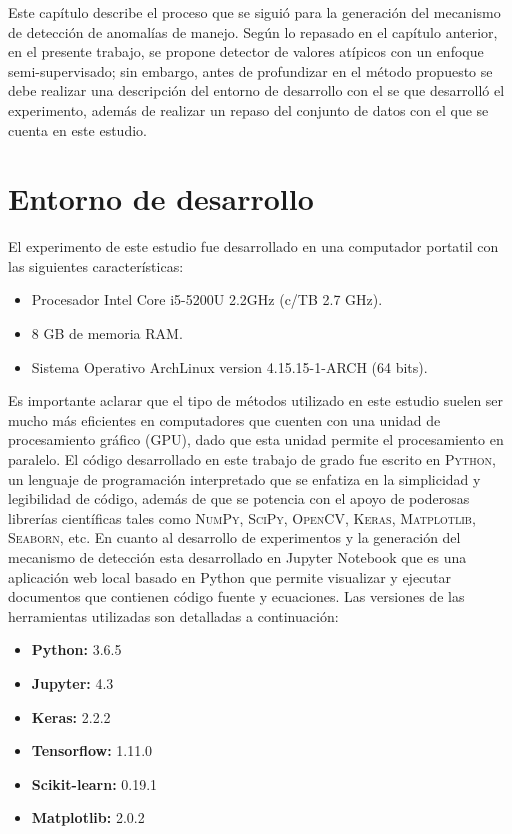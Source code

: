 Este cap\'{i}tulo describe el proceso que se sigui\'{o} para la generaci\'{o}n del mecanismo de detecci\'{o}n de anomal\'{i}as de manejo. Seg\'{u}n lo repasado en el cap\'{i}tulo anterior, en el presente trabajo, se propone detector de valores at\'{i}picos con un enfoque semi-supervisado; sin embargo, antes de profundizar en el m\'{e}todo propuesto se debe realizar una descripci\'{o}n del entorno de desarrollo con el se que desarroll\'{o} el experimento, adem\'{a}s de realizar un repaso del conjunto de datos con el que se cuenta en este estudio.

\section{Entorno de desarrollo}

El experimento de este estudio fue desarrollado en una computador portatil con las siguientes caracter\'{i}sticas:

\begin{itemize}
\item Procesador Intel Core i5-5200U 2.2GHz (c/TB 2.7 GHz).
\item 8 GB de memoria RAM.
\item Sistema Operativo ArchLinux version 4.15.15-1-ARCH (64 bits). 
\end{itemize}

Es importante aclarar que el tipo de m\'{e}todos utilizado en este estudio suelen ser mucho m\'{a}s eficientes en computadores que cuenten con una unidad de procesamiento gr\'{a}fico (GPU), dado que esta unidad permite el procesamiento en paralelo. El c\'{o}digo desarrollado en este trabajo de grado fue escrito en \textsc{Python}, un lenguaje de programaci\'{o}n interpretado que se enfatiza en la simplicidad y legibilidad de c\'{o}digo, adem\'{a}s de que se potencia con el apoyo de poderosas librer\'{i}as cient\'{i}ficas tales como \textsc{NumPy}, \textsc{SciPy}, \textsc{OpenCV}, \textsc{Keras}, \textsc{Matplotlib}, \textsc{Seaborn}, etc. En cuanto al desarrollo de experimentos y la generaci\'{o}n del mecanismo de detecci\'{o}n esta desarrollado en Jupyter Notebook que es una aplicaci\'{o}n web local basado en Python que permite visualizar y ejecutar documentos que contienen c\'{o}digo fuente y ecuaciones. Las versiones de las herramientas utilizadas son detalladas a continuaci\'{o}n:

\begin{itemize}
\item \textbf{Python:} 3.6.5

\item \textbf{Jupyter:} 4.3

\item \textbf{Keras:} 2.2.2

\item \textbf{Tensorflow:} 1.11.0

\item \textbf{Scikit-learn:} 0.19.1

\item \textbf{Matplotlib:} 2.0.2
\end{itemize}

